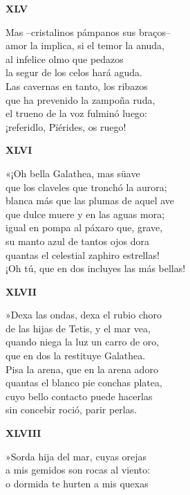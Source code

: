 \documentclass[11pt,twoside]{article}
\begin{document}
%
\begin{center}
	\textbf{XLV}
\end{center}\postart
Mas --cristalinos pámpanos sus braços--\\
amor la implica, si el temor la anuda,\\
al infelice olmo que pedazos\\
la segur de los celos hará aguda.\\
Las cavernas en tanto, los ribazos\\
que ha prevenido la zampoña ruda,\\
el trueno de la voz fulminó luego:\\
¡referidlo, Pïérides, os ruego!\par\poend
%
\begin{center}
	\textbf{XLVI}
\end{center}\postart
«¡Oh bella Galathea, mas süave\\
que los claveles que tronchó la aurora;\\
blanca más que las plumas de aquel ave\\
que dulce muere y en las aguas mora;\\
igual en pompa al páxaro que, grave,\\
su manto azul de tantos ojos dora\\
quantas el celestial zaphiro estrellas!\\
¡Oh tú, que en dos incluyes las más bellas!\par\poend
%
\begin{center}
	\textbf{XLVII}
\end{center}\postart
»Dexa las ondas, dexa el rubio choro\\
de las hijas de Tetis, y el mar vea,\\
quando niega la luz un carro de oro,\\
que en dos la restituye Galathea.\\
Pisa la arena, que en la arena adoro\\
quantas el blanco pie conchas platea,\\
cuyo bello contacto puede hacerlas\\
sin concebir roció, parir perlas.\par\poend
%
\begin{center}
	\textbf{XLVIII}
\end{center}\postart
»Sorda hija del mar, cuyas orejas\\
a mis gemidos son rocas al viento:\\
o dormida te hurten a mis quexas\\
\end{document}
